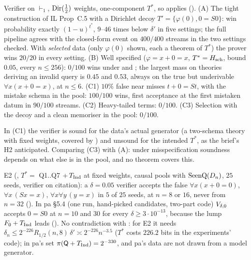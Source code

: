 \begin{remark}\label{rem:sound:e4}
Verifier on $\vdash_1$, $\mathrm{Dir}(\tfrac12)$ weights, one-component $T^*$, so  applies (). (A) The tight construction of IL Prop~C.5 with a Dirichlet decoy $T'=\{\varphi(0),0=S0\}$: win probability exactly $(1-u)^{t^*}$, $9$--$46$ times below $\delta'$ in five settings; the full pipeline agrees with the closed-form event on $400/400$ streams in the two settings checked. With \emph{selected} data (only $\varphi(0)$ shown, each a theorem of $T^*$) the prover wins $20/20$ in every setting. (B) Well specified ($\varphi=x+0=x$, $T^*=H_{\mathrm{sch}}$, bound $0.05$, every $n\le256$): $0/100$ wins under \Lzero{} and \Lone; the largest mass on theories deriving an invalid query is $0.45$ and $0.53$, always on the true but underivable $\forall x(x+0=x)$, at $n\le6$. (C1) $10\%$ false near misses $t+0=St$, with the mistake schema in the pool: $100/100$ wins, first acceptance at the first mistaken datum in $90/100$ streams. (C2) Heavy-tailed terms: $0/100$. (C3) Selection with the decoy and a clean memoriser in the pool: $0/100$.
\end{remark}

In (C1) the verifier is sound for the data's actual generator (a two-schema theory with fixed weights, covered by ) and unsound for the intended $T^*$, as the brief's H2 anticipated. Comparing (C3) with (A): under misspecification soundness depends on what else is in the pool, and no theorem covers this.

\begin{remark}\label{rem:sound:lumps}
E2 (\Lzero, $T^*=$ Q1..Q7 $+\,T_{\mathrm{Ind}}$ at fixed weights, causal pools with $\mathrm{SeenQ}(D_n)$, $25$ seeds, verifier on citation): a $\delta=0.05$ verifier accepts the false $\forall x(x+0=0)$, $\forall x\,(Sx=x)$, $\forall x\forall y\,(y=x)$ in $5$ of $25$ seeds, at $n=8$ or $16$, never from $n=32$ (). In pa \S5.4 (one run, hand-picked candidates, two-part code) $V_{\delta,0}$ accepts $0=S0$ at $n=10$ and $30$ for every $\delta\ge3\cdot10^{-13}$, because the lump $F_0+T_{\mathrm{Ind}}$ leads (). No contradiction with : for E2 it needs $\delta_n\le2^{-226}R_{1/2}(n,8)\,\delta'\asymp2^{-226}n^{-3.5}$ ($T^*$ costs $226.2$ bits in the experiments' code); in pa's set $\pi(\mathsf{Q}+T_{\mathrm{Ind}})=2^{-330}$, and pa's data are not drawn from a model generator.
\end{remark}


